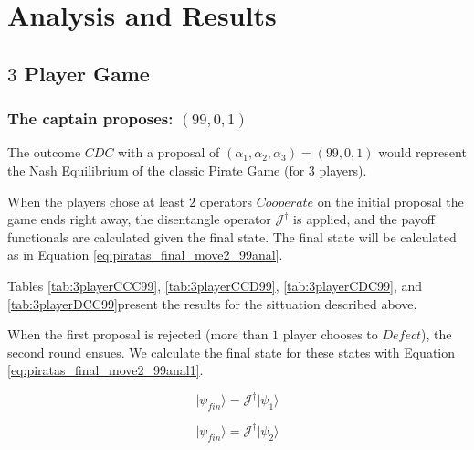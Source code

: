 \section{Analysis and Results}
\label{sec:description_3}


\subsection{$3$ Player Game}
\label{subsec:3playergame}

\subsubsection{The captain proposes: $(99, 0, 1)$}
\label{subsubsec:3playergame99}

The outcome $CDC$ with a proposal of $(\alpha_{1}, \alpha_{2}, \alpha_{3}) =(99, 0, 1)$ would represent the Nash Equilibrium of the classic Pirate Game (for $3$ players). 

When the players chose at least $2$ operators $Cooperate$ on the initial proposal the game ends right away, the disentangle operator $\mathcal{J}^{\dagger}$ is applied, and the payoff functionals are calculated given the final state. The final state will be calculated as in Equation \ref{eq:piratas_final_move2_99anal}. 

Tables \ref{tab:3playerCCC99}, \ref{tab:3playerCCD99}, \ref{tab:3playerCDC99}, and \ref{tab:3playerDCC99}present the results for the sittuation described above.

When the first proposal is rejected (more than $1$ player chooses to $Defect$), the second round ensues. We calculate the final state for these states with Equation \ref{eq:piratas_final_move2_99anal1}.

\begin{equation}
\label{eq:piratas_final_move2_99anal}
\vert\psi_{fin}\rangle= \mathcal{J}^{\dagger}\vert\psi_{1}\rangle
\end{equation}

\begin{equation}
\label{eq:piratas_final_move2_99anal1}
\vert\psi_{fin}\rangle= \mathcal{J}^{\dagger}\vert\psi_{2}\rangle
\end{equation}

